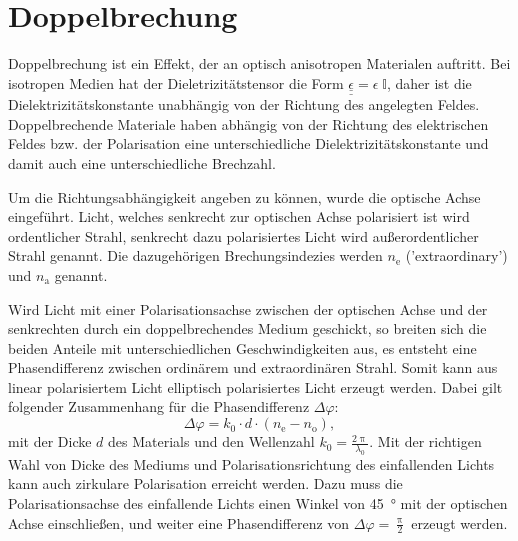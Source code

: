 \section{Doppelbrechung}

Doppelbrechung ist ein Effekt, der an optisch anisotropen Materialen auftritt.
Bei isotropen Medien hat der Dieletrizitätstensor die Form $\underline{\underline{\epsilon}} = \epsilon \; \mathbb{I}$, daher ist die Dielektrizitätskonstante unabhängig von der Richtung des angelegten Feldes.
Doppelbrechende Materiale haben abhängig von der Richtung des elektrischen Feldes bzw. der Polarisation eine unterschiedliche Dielektrizitätskonstante und damit auch eine unterschiedliche Brechzahl.

Um die Richtungsabhängigkeit angeben zu können, wurde die optische Achse eingeführt.
Licht, welches senkrecht zur optischen Achse polarisiert ist wird ordentlicher Strahl, senkrecht dazu polarisiertes Licht wird außerordentlicher Strahl genannt.
Die dazugehörigen Brechungsindezies werden $n_\text{e}$ ('extraordinary') und $n_\text{a}$ genannt.

Wird Licht mit einer Polarisationsachse zwischen der optischen Achse und der senkrechten durch ein doppelbrechendes Medium geschickt, so breiten sich die beiden Anteile mit unterschiedlichen Geschwindigkeiten aus, es entsteht eine Phasendifferenz zwischen ordinärem und extraordinären Strahl.
Somit kann aus linear polarisiertem Licht elliptisch polarisiertes Licht erzeugt werden.
Dabei gilt folgender Zusammenhang für die Phasendifferenz $\Delta \varphi$:
\begin{equation} \label{eq:phasediff}
	\Delta \varphi = k_0 \cdot d \cdot \left(n_\text{e} - n_\text{o}\right),
\end{equation}
mit der Dicke $d$ des Materials und den Wellenzahl $k_0 = \frac{2 \uppi}{\lambda_0}$.
Mit der richtigen Wahl von Dicke des Mediums und Polarisationsrichtung des einfallenden Lichts kann auch zirkulare Polarisation erreicht werden.
Dazu muss die Polarisationsachse des einfallende Lichts einen Winkel von \SI{45}{\degree} mit der optischen Achse einschließen, und weiter eine Phasendifferenz von $\Delta \varphi = \frac{\uppi}{2}$ erzeugt werden.
